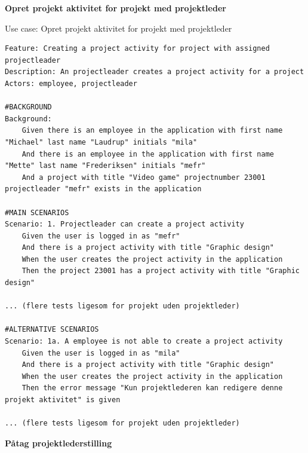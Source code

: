 \textbf{Opret projekt aktivitet for projekt med projektleder}
\begin{listing}[H]
    \centering
    \caption{Use case: Opret projekt aktivitet for projekt med projektleder} \label{lst:usecase_project_activity_with_leader}
    \begin{verbatim}  
Feature: Creating a project activity for project with assigned projectleader
Description: An projectleader creates a project activity for a project
Actors: employee, projectleader

#BACKGROUND
Background:
    Given there is an employee in the application with first name "Michael" last name "Laudrup" initials "mila"
    And there is an employee in the application with first name "Mette" last name "Frederiksen" initials "mefr"
    And a project with title "Video game" projectnumber 23001 projectleader "mefr" exists in the application

#MAIN SCENARIOS
Scenario: 1. Projectleader can create a project activity
    Given the user is logged in as "mefr"
    And there is a project activity with title "Graphic design"  
    When the user creates the project activity in the application 
    Then the project 23001 has a project activity with title "Graphic design" 

... (flere tests ligesom for projekt uden projektleder)

#ALTERNATIVE SCENARIOS
Scenario: 1a. A employee is not able to create a project activity
    Given the user is logged in as "mila"
    And there is a project activity with title "Graphic design"  
    When the user creates the project activity in the application 
    Then the error message "Kun projektlederen kan redigere denne projekt aktivitet" is given
    
... (flere tests ligesom for projekt uden projektleder)

    \end{verbatim}
\end{listing}\newpage
\textbf{Påtag projektlederstilling}
